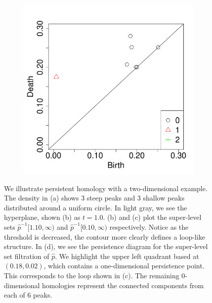 \documentclass[12pt]{article}
\begin{document}
\begin{figure}
\begin{subfigure}{.25\linewidth}
    \label{fig:example_contour2}
  \end{subfigure}
    \begin{subfigure}{.20\linewidth}
    \centering
    \caption{}
        \includegraphics[width=\linewidth]{fig_2_pd.pdf}
    \label{fig:example_pd}
  \end{subfigure}
  \caption{ We illustrate persistent homology with a two-dimensional example. The density in (a) shows 3 steep peaks and 3 shallow peaks  distributed around a uniform circle. In light gray, we see the hyperplane, shown (b) as $t=1.0$. (b) and (c) plot the super-level sets $\widehat{p}^{-1}[1.10,\infty)$ and $\widehat{p}^{-1}[0.10,\infty)$ respectively. Notice as the threshold is decreased, the contour more clearly defines a loop-like structure. In (d), we see the  persistence diagram for the super-level set filtration of $\widehat{p}$. We highlight the upper left quadrant based at $(0.18, 0.02)$, which contains a one-dimensional persistence point. This corresponds to the loop shown in (c). The remaining 0-dimensional homologies represent the connected components from each of 6 peaks.} %
    \label{fig:homologyexample}
\end{figure}
\end{document}
